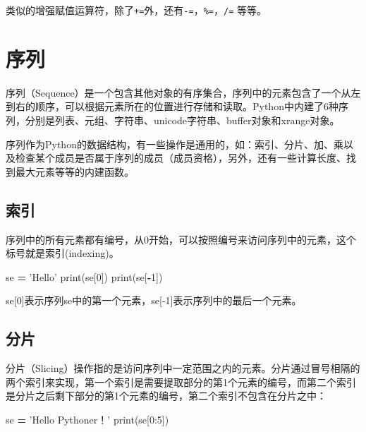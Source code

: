 \documentclass[]{ctexbook}
\newenvironment{Shaded}{\begin{snugshade}}{\end{snugshade}}
\newcommand{\BuiltInTok}[1]{#1}
\newcommand{\DecValTok}[1]{\textcolor[rgb]{0.00,0.00,0.81}{#1}}
\newcommand{\NormalTok}[1]{#1}
\newcommand{\OperatorTok}[1]{\textcolor[rgb]{0.81,0.36,0.00}{\textbf{#1}}}
\newcommand{\StringTok}[1]{\textcolor[rgb]{0.31,0.60,0.02}{#1}}
\begin{document}
类似的增强赋值运算符，除了\texttt{+=}外，还有\texttt{-=}，\texttt{\%=}，\texttt{/=} 等等。

\hypertarget{ux5e8fux5217}{%
\section{序列}\label{ux5e8fux5217}}

序列（Sequence）是一个包含其他对象的有序集合，序列中的元素包含了一个从左到右的顺序，可以根据元素所在的位置进行存储和读取。Python中内建了6种序列，分别是列表、元组、字符串、unicode字符串、buffer对象和xrange对象。

序列作为Python的数据结构，有一些操作是通用的，如：索引、分片、加、乘以及检查某个成员是否属于序列的成员（成员资格），另外，还有一些计算长度、找到最大元素等等的内建函数。

\hypertarget{ux7d22ux5f15}{%
\subsection{索引}\label{ux7d22ux5f15}}

序列中的所有元素都有编号，从0开始，可以按照编号来访问序列中的元素，这个标号就是索引(indexing)。

\begin{Shaded}
\begin{Highlighting}[]
\NormalTok{se }\OperatorTok{=} \StringTok{'Hello'}
\BuiltInTok{print}\NormalTok{(se[}\DecValTok{0}\NormalTok{])}
\BuiltInTok{print}\NormalTok{(se[}\OperatorTok{-}\DecValTok{1}\NormalTok{])}
\end{Highlighting}
\end{Shaded}

se{[}0{]}表示序列se中的第一个元素，se{[}-1{]}表示序列中的最后一个元素。

\hypertarget{ux5206ux7247}{%
\subsection{分片}\label{ux5206ux7247}}

分片（Slicing）操作指的是访问序列中一定范围之内的元素。分片通过冒号相隔的两个索引来实现，第一个索引是需要提取部分的第1个元素的编号，而第二个索引是分片之后剩下部分的第1个元素的编号，第二个索引不包含在分片之中：

\begin{Shaded}
\begin{Highlighting}[]
\NormalTok{se }\OperatorTok{=} \StringTok{'Hello Pythoner！'}
\StringTok{print(se[0:5])}
\end{Highlighting}
\end{Shaded}
\end{document}
